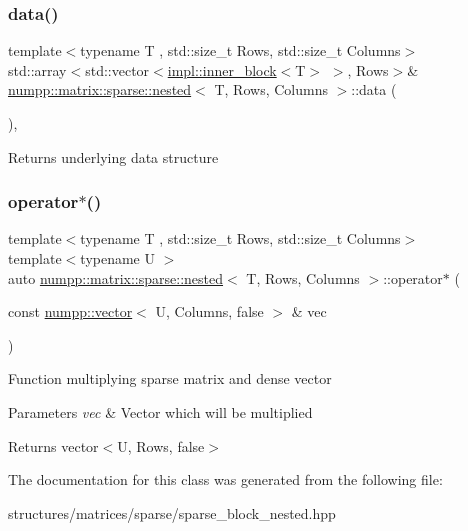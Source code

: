 \subsubsection{\texorpdfstring{data()}{data()}\hspace{0.1cm}{\footnotesize\ttfamily [2/2]}}
{\footnotesize\ttfamily template$<$typename T , std\+::size\+\_\+t Rows, std\+::size\+\_\+t Columns$>$ \\
std\+::array$<$std\+::vector$<$\hyperlink{structnumpp_1_1matrix_1_1sparse_1_1impl_1_1inner__block}{impl\+::inner\+\_\+block}$<$T$>$ $>$, Rows$>$\& \hyperlink{classnumpp_1_1matrix_1_1sparse_1_1nested}{numpp\+::matrix\+::sparse\+::nested}$<$ T, Rows, Columns $>$\+::data (\begin{DoxyParamCaption}{ }\end{DoxyParamCaption})\hspace{0.3cm}{\ttfamily [inline]}, {\ttfamily [noexcept]}}

Returns underlying data structure \mbox{\label{classnumpp_1_1matrix_1_1sparse_1_1nested_a5348b9ed5e038a10885b5b849614fdba}} 
\subsubsection{\texorpdfstring{operator$\ast$()}{operator*()}}
{\footnotesize\ttfamily template$<$typename T , std\+::size\+\_\+t Rows, std\+::size\+\_\+t Columns$>$ \\
template$<$typename U $>$ \\
auto \hyperlink{classnumpp_1_1matrix_1_1sparse_1_1nested}{numpp\+::matrix\+::sparse\+::nested}$<$ T, Rows, Columns $>$\+::operator$\ast$ (\begin{DoxyParamCaption}\item[{const \hyperlink{classnumpp_1_1vector}{numpp\+::vector}$<$ U, Columns, false $>$ \&}]{vec }\end{DoxyParamCaption})\hspace{0.3cm}{\ttfamily [inline]}}

Function multiplying sparse matrix and dense vector


\begin{DoxyParams}{Parameters}
{\em vec} & Vector which will be multiplied \\
\hline
\end{DoxyParams}
\begin{DoxyReturn}{Returns}
vector$<$\+U, Rows, false$>$ 
\end{DoxyReturn}


The documentation for this class was generated from the following file\+:\begin{DoxyCompactItemize}
\item 
structures/matrices/sparse/sparse\+\_\+block\+\_\+nested.\+hpp\end{DoxyCompactItemize}
